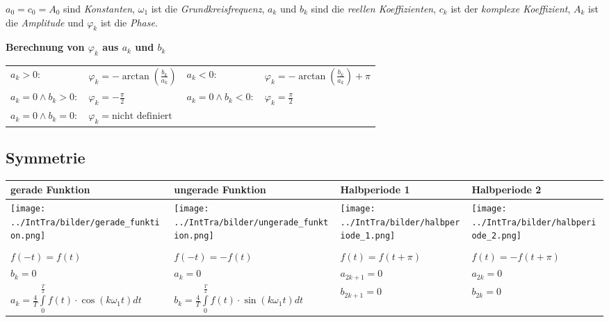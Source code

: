 	$a_0=c_0=A_0$ sind \textit{Konstanten}, $\omega_1$ ist die
	\textit{Grundkreisfrequenz}, $a_k$ und $b_k$ sind die \textit{reellen
	Koeffizienten}, $c_k$ ist der \textit{komplexe Koeffizient}, $A_k$ ist die
	\textit{Amplitude} und $\varphi_k$ ist die \textit{Phase}.\\

	\textbf{Berechnung von $\varphi_k$ aus $a_k$ und $b_k$}\\
	\begin{tabular}{p{4cm}p{4cm}p{3cm}p{3.5cm}}
		$a_k> 0:$ & $\varphi_k = -\arctan(\frac{b_k}{a_k})$ &
		$a_k<0:$ &	$\varphi_k = -\arctan(\frac{b_k}{a_k}) + \pi$\\
		$a_k = 0 \wedge b_k > 0:$ &	$\varphi_k = -\frac{\pi}{2}$ &
		$a_k = 0 \wedge b_k < 0:$ &	$\varphi_k = \frac{\pi}{2}$\\
		$a_k = 0 \wedge b_k = 0:$ &	$\varphi_k = \text{nicht definiert}$
	\end{tabular}

	\subsection{Symmetrie}
		\begin{tabular}{|p{4.3cm}|p{4.3cm}|p{4.4cm}|p{4.4cm}|}
         	\hline
        	\textbf{gerade Funktion} & \textbf{ungerade Funktion} &
        	\textbf{Halbperiode 1} & \textbf{Halbperiode 2}\\
        	\hline
        	\texttt{[image: ../IntTra/bilder/gerade\_funktion.png]}&
        	\texttt{[image: ../IntTra/bilder/ungerade\_funktion.png]}&   
 			\texttt{[image: ../IntTra/bilder/halbperiode\_1.png]}&   
			\texttt{[image: ../IntTra/bilder/halbperiode\_2.png]}\\
			\hline & & & \\			
   			$f(-t)=f(t)$ & $f(-t)=-f(t)$ & $f(t)=f(t+\pi)$ & $f(t)=-f(t+\pi)$\\
   			$b_k=0$ & $a_k=0$ & $a_{2k+1}=0$ & $a_{2k}=0$\\
   			$a_k = \frac{4}{T} \int\limits_0^{\frac{T}{2}} f(t) \cdot \cos(k \omega_1
   			t) dt$ &
   			$b_k =  \frac{4}{T} \int\limits_0^{\frac{T}{2}} f(t) \cdot
			\sin(k \omega_1 t) dt$ &
			$b_{2k+1}=0$ & $b_{2k}=0$\\
			\hline
      	\end{tabular}


